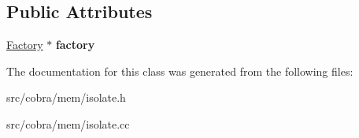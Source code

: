 \subsection*{Public Attributes}
\begin{DoxyCompactItemize}
\item 
\hypertarget{class_cobra_1_1internal_1_1_isolate_a29719d0436322bc0e85817c9648769b0}{\hyperlink{class_cobra_1_1internal_1_1_factory}{Factory} $\ast$ {\bfseries factory}}\label{class_cobra_1_1internal_1_1_isolate_a29719d0436322bc0e85817c9648769b0}

\end{DoxyCompactItemize}


The documentation for this class was generated from the following files\+:\begin{DoxyCompactItemize}
\item 
src/cobra/mem/isolate.\+h\item 
src/cobra/mem/isolate.\+cc\end{DoxyCompactItemize}
